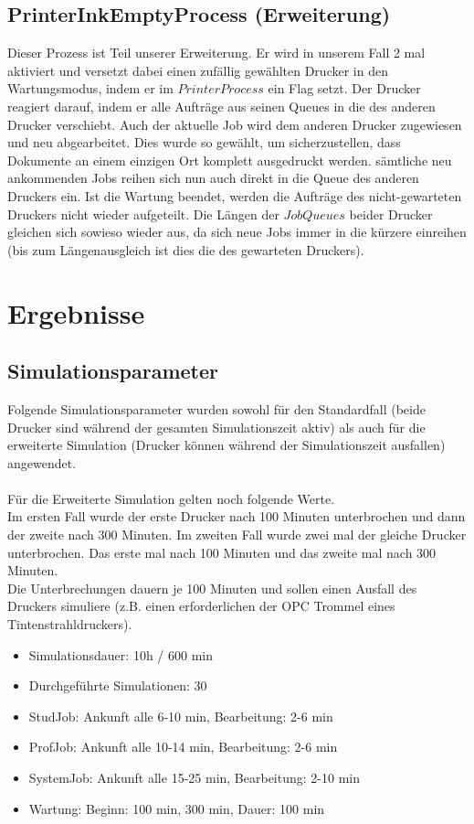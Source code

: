 \documentclass[12pt,a4paper]{article}
\begin{document}
	\subsection{PrinterInkEmptyProcess (Erweiterung)}
	Dieser Prozess ist Teil unserer Erweiterung. Er wird in unserem Fall 2 mal aktiviert und versetzt dabei einen zufällig gewählten Drucker in den Wartungsmodus, indem er im $PrinterProcess$ ein Flag setzt. 
	Der Drucker reagiert darauf, indem er alle Aufträge aus seinen Queues in die des anderen Drucker verschiebt. Auch der aktuelle Job wird dem anderen Drucker zugewiesen und neu abgearbeitet. Dies wurde 
	so gewählt, um sicherzustellen, dass Dokumente an einem einzigen Ort komplett ausgedruckt werden. sämtliche neu ankommenden Jobs reihen sich nun auch direkt in die Queue des anderen Druckers
	ein. Ist die Wartung beendet, werden die Aufträge des nicht-gewarteten Druckers nicht wieder aufgeteilt. Die Längen der $JobQueues$ beider Drucker gleichen sich sowieso wieder aus, da sich neue Jobs
	immer in die kürzere einreihen (bis zum Längenausgleich ist dies die des gewarteten Druckers).
	
	\section{Ergebnisse}
	\subsection{Simulationsparameter}
	Folgende Simulationsparameter wurden sowohl für den Standardfall (beide Drucker sind während der gesamten Simulationszeit aktiv) als auch für die erweiterte Simulation (Drucker können während der
	 Simulationszeit ausfallen) angewendet.\\
	\\
	Für die Erweiterte Simulation gelten noch folgende Werte.\\
	Im ersten Fall wurde der erste Drucker nach 100 Minuten unterbrochen und dann der zweite nach 300 Minuten.
	Im zweiten Fall wurde zwei mal der gleiche Drucker unterbrochen. Das erste mal nach 100 Minuten und das zweite mal nach 300 Minuten.\\
	Die Unterbrechungen dauern je 100 Minuten und sollen einen Ausfall des Druckers simuliere (z.B. einen erforderlichen der OPC Trommel eines Tintenstrahldruckers).
	\\
	\begin{itemize}
		\item Simulationsdauer: 10h / 600 min
		\item Durchgeführte Simulationen: 30
		\item StudJob: Ankunft alle 6-10 min, Bearbeitung: 2-6 min
		\item ProfJob: Ankunft alle 10-14 min, Bearbeitung: 2-6 min
		\item SystemJob: Ankunft alle 15-25 min, Bearbeitung: 2-10 min
		\item Wartung: Beginn: 100 min, 300 min, Dauer: 100 min
	\end{itemize}	
		
\end{document}
